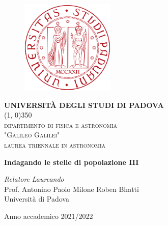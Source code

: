 \documentclass[12pt]{article}
\begin{document}
	\begin{center}
	 
	
	\begin{figure}
		\centering
  		\includegraphics[height=4.5cm]{unipd-bn.png}
	\end{figure}

	\vspace{20pt}

	\scshape{\Large{\bfseries{UNIVERSITÀ DEGLI STUDI DI PADOVA}}} \\
	\line(1, 0){350} \\
	\vspace{15pt}
	\scshape{\large{dipartimento di fisica e astronomia \\ "Galileo Galilei"
}} \\

	\vspace{45pt}
	\scshape{\large{laurea triennale in astronomia}}
	

	

	\vspace{50pt}
	
{\LARGE{\bfseries{Indagando le stelle di popolazione III }}} \\
	\vspace{25pt}
	\vspace{15pt}
	
		

	\vfill
	\begin{normalsize}
	\begin{flushleft}
	  \textit{Relatore} \hfill \textit{Laureando}\\
	  \vspace{1pt}
	  \textrm{Prof. Antonino Paolo Milone} \hfill \textrm{Roben Bhatti} \\	  Università di Padova \\
	  
	\end{flushleft}
	\end{normalsize}
	
	\vspace{20pt}
	\large{Anno accademico 2021/2022}
	
	\end{center}
	\vspace*{\fill}
\pagestyle{empty}	
\newpage
\
\pagestyle{empty}
\newpage
\end{document}
